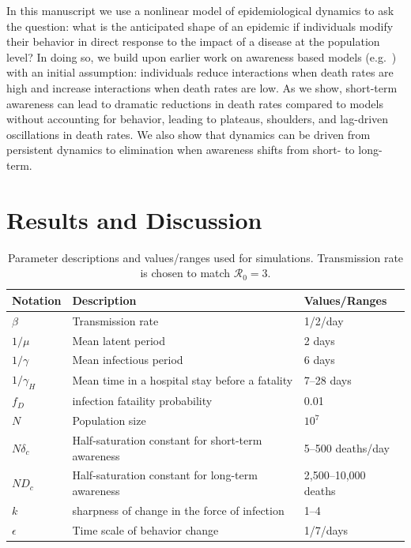 In this manuscript we use a nonlinear model of epidemiological dynamics to
ask the question: what is the anticipated
shape of an epidemic if individuals modify their behavior in direct
response to the impact of a disease at the population level? In doing so,
we build upon earlier work on awareness based models (e.g.~\citep{funk2009spread,funk2010modelling,eksin2017disease, eksin2019systematic}) with an
initial assumption: individuals reduce interactions when 
death rates are high and increase interactions when death rates are low.  
As we show, short-term awareness can lead to dramatic reductions
in death rates compared to models without accounting for behavior,
leading to plateaus, shoulders,
and lag-driven oscillations in death rates. We also show that dynamics
can be driven from persistent dynamics to elimination when
awareness shifts from short- to long-term.


\section{Results and Discussion}

\begin{table}[!h]
\begin{tabular}{l|p{3cm}|l}
\hline
Notation & Description & Values/Ranges\\
\hline
$\beta$ & Transmission rate & 1/2/day \\
$1/\mu$ & Mean latent period & 2 days \\
$1/\gamma$ & Mean infectious period & 6 days \\
$1/\gamma_H$ & Mean time in a hospital stay before a fatality & 7--28 days\\
$f_D$ & infection fataility probability & 0.01 \\
$N$ & Population size & $10^7$ \\
$N\delta_c$ & Half-saturation constant for short-term awareness & 5--500 deaths/day \\
$ND_c$ & Half-saturation constant for long-term awareness & 2,500--10,000 deaths \\
$k$ & sharpness of change in the force of infection & 1--4 \\
$\epsilon$ & Time scale of behavior change & 1/7/days \\
\hline
\end{tabular}
\caption{
Parameter descriptions and values/ranges used for simulations. Transmission rate is chosen to match $\mathcal{R}_0 = 3$.
}
\end{table}

